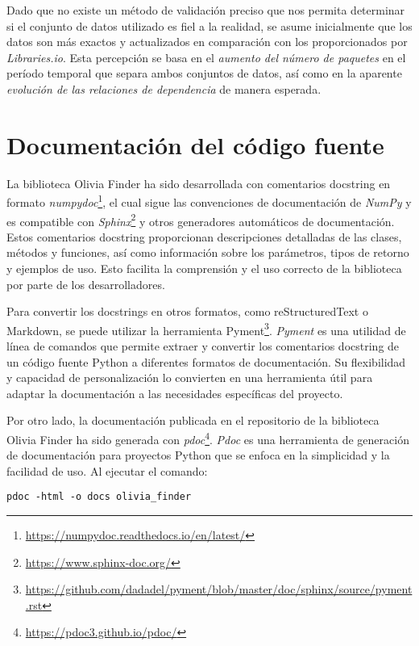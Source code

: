 Dado que no existe un método de validación preciso que nos permita determinar si el conjunto de datos utilizado es fiel a 
la realidad, se asume inicialmente que los datos son más exactos y actualizados en comparación con los proporcionados por 
\textit{Libraries.io}. Esta percepción se basa en el \textit{aumento del número de paquetes} en el período temporal que 
separa ambos conjuntos de datos, así como en la aparente \textit{evolución de las relaciones de dependencia} de manera esperada.

\section{Documentación del código fuente}

La biblioteca Olivia Finder ha sido desarrollada con comentarios docstring en formato 
\textit{numpydoc}\footnote{\url{https://numpydoc.readthedocs.io/en/latest/}}, 
el cual sigue las convenciones de documentación de \textit{NumPy} y es compatible con \textit{Sphinx}\footnote{\url{https://www.sphinx-doc.org/}} y otros generadores 
automáticos de documentación. Estos comentarios docstring proporcionan descripciones detalladas de 
las clases, métodos y funciones, así como información sobre los parámetros, tipos de retorno y ejemplos 
de uso. Esto facilita la comprensión y el uso correcto de la biblioteca por parte de los desarrolladores.

Para convertir los docstrings en otros formatos, como reStructuredText o Markdown, se puede utilizar la 
herramienta Pyment\footnote{\url{https://github.com/dadadel/pyment/blob/master/doc/sphinx/source/pyment.rst}}. 
\textit{Pyment} es una utilidad de línea de comandos 
que permite extraer y convertir los comentarios docstring de un código fuente Python a diferentes formatos 
de documentación. Su flexibilidad y capacidad de personalización lo convierten en una herramienta útil 
para adaptar la documentación a las necesidades específicas del proyecto.

Por otro lado, la documentación publicada en el repositorio de la biblioteca Olivia Finder ha sido generada 
con \textit{pdoc}\footnote{\url{https://pdoc3.github.io/pdoc/}}. \textit{Pdoc} es una herramienta de generación de documentación 
para proyectos Python que se enfoca en la simplicidad y la facilidad de uso. Al ejecutar el comando:

\begin{center}
    \texttt{pdoc -html -o docs olivia\_finder}
\end{center}

